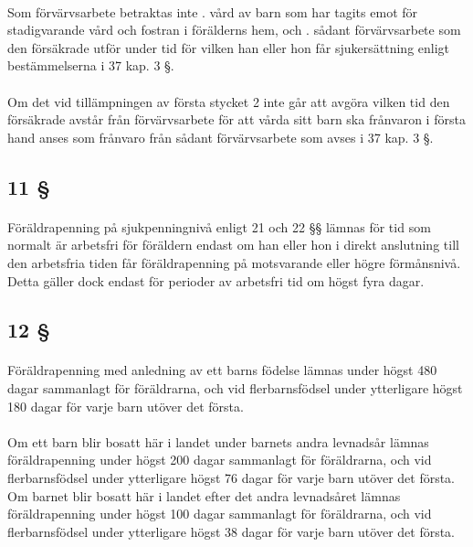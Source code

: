 \documentclass[a4paper,notitlepage,openany,10pt]{book}
\begin{document}
\paragraph*{}
Som förvärvsarbete betraktas inte
. vård av barn som har tagits emot för stadigvarande vård och fostran i förälderns hem, och
. sådant förvärvsarbete som den försäkrade utför under tid för vilken han eller hon får sjukersättning enligt bestämmelserna i 37 kap. 3 §.
\paragraph*{}
Om det vid tillämpningen av första stycket 2 inte går att avgöra vilken tid den försäkrade avstår från förvärvsarbete för att vårda sitt barn ska frånvaron i första hand anses som frånvaro från sådant förvärvsarbete som avses i 37 kap. 3 §.
\subsection*{11 §}
\paragraph*{}
Föräldrapenning på sjukpenningnivå enligt 21 och 22 §§ lämnas för tid som normalt är arbetsfri för föräldern endast om han eller hon i direkt anslutning till den arbetsfria tiden får föräldrapenning på motsvarande eller högre förmånsnivå. Detta gäller dock endast för perioder av arbetsfri tid om högst fyra dagar.
\subsection*{12 §}
\paragraph*{}
Föräldrapenning med anledning av ett barns födelse lämnas under högst 480 dagar sammanlagt för föräldrarna, och vid flerbarnsfödsel under ytterligare högst 180 dagar för varje barn utöver det första.
\paragraph*{}
Om ett barn blir bosatt här i landet under barnets andra levnadsår lämnas föräldrapenning under högst 200 dagar sammanlagt för föräldrarna, och vid flerbarnsfödsel under ytterligare högst 76 dagar för varje barn utöver det första. Om barnet blir bosatt här i landet efter det andra levnadsåret lämnas föräldrapenning under högst 100 dagar sammanlagt för föräldrarna, och vid flerbarnsfödsel under ytterligare högst 38 dagar för varje barn utöver det första.
\end{document}
